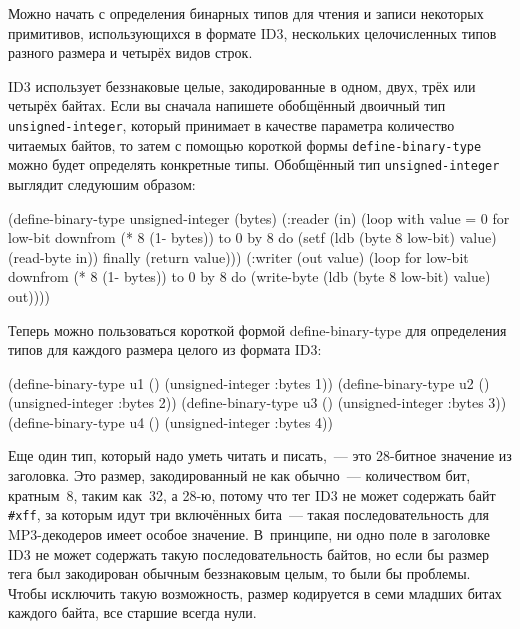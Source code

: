 Можно начать с определения бинарных типов для чтения и записи некоторых примитивов, 
использующихся в формате ID3,
нескольких целочисленных типов разного размера и четырёх видов строк.

ID3 использует беззнаковые целые, закодированные в одном, двух, трёх или четырёх байтах.
Если вы сначала напишете обобщённый двоичный тип \lstinline{unsigned-integer},
который принимает в качестве параметра количество читаемых байтов, то затем
с помощью короткой формы \lstinline{define-binary-type} можно будет определять
конкретные типы. Обобщённый тип \lstinline{unsigned-integer} выглядит следуюшим образом:
\begin{myverb}
(define-binary-type unsigned-integer (bytes)
  (:reader (in)
    (loop with value = 0
       for low-bit downfrom (* 8 (1- bytes)) to 0 by 8 do
         (setf (ldb (byte 8 low-bit) value) (read-byte in))
       finally (return value)))
  (:writer (out value)
    (loop for low-bit downfrom (* 8 (1- bytes)) to 0 by 8
       do (write-byte (ldb (byte 8 low-bit) value) out))))
\end{myverb}

Теперь можно пользоваться короткой формой define-binary-type для определения типов для
каждого размера целого из формата ID3:

\begin{myverb}
(define-binary-type u1 () (unsigned-integer :bytes 1))
(define-binary-type u2 () (unsigned-integer :bytes 2))
(define-binary-type u3 () (unsigned-integer :bytes 3))
(define-binary-type u4 () (unsigned-integer :bytes 4))
\end{myverb}

Еще один тип, который надо уметь читать и писать,~--- это 28-битное значение из заголовка.
Это размер, закодированный не как обычно~--- количеством бит, кратным~8, таким как~32, а
28-ю, потому что тег ID3 не может содержать байт \lstinline!#xff!, за
которым идут три включённых бита~--- такая последовательность для
MP3-декодеров имеет особое значение.  В~принципе, ни одно поле в заголовке ID3 не может содержать такую
последовательность байтов, но если бы размер тега был закодирован обычным беззнаковым
целым, то были бы проблемы.  Чтобы исключить такую возможность, размер кодируется в семи
младших битах каждого байта, все старшие всегда нули.

